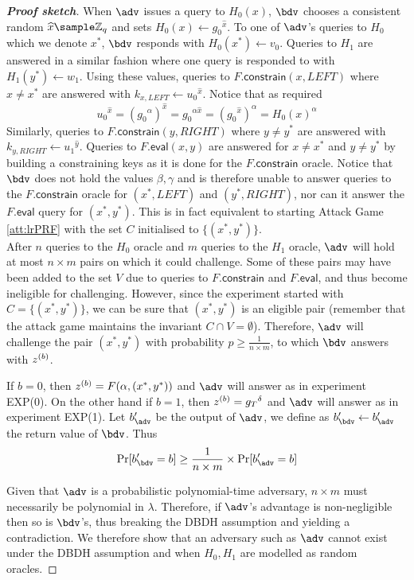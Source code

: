 \begin{proof}[\textbf{Proof sketch}]
			When $\adv$ issues a query to $H_0(x)$, $\bdv$ chooses a consistent random $\widehat x \sample \mathbb{Z}_q$ and sets $H_0(x) \leftarrow {g_0}^{\widehat x}$. To one of $\adv$'s queries to $H_0$ which we denote $x^*$, $\bdv$ responds with $H_0(x^*) \leftarrow v_0$. Queries to $H_1$ are answered in a similar fashion where one query is responded to with $H_1(y^*) \leftarrow w_1$. Using these values, queries to $F.\mathsf{constrain}(x,LEFT)$ where $x\neq x^*$ are answered with $k_{x,LEFT} \leftarrow  {u_0}^{\widehat x}$. Notice that as required
				$$ {u_0}^{\widehat x} = \left({g_0}^\alpha\right)^{\widehat x} = {g_0}^{\alpha \widehat x} = \left({g_0}^{\widehat x}\right)^{\alpha} = H_0(x)^\alpha$$
			Similarly, queries to $F.\mathsf{constrain}(y,RIGHT)$ where $y\neq y^*$ are answered with $k_{y,RIGHT} \leftarrow  {u_1}^{\widehat y}$. Queries to $F.\mathsf{eval}(x,y)$ are answered for $x \neq x^*$ and $y \neq y^*$ by building a constraining keys as it is done for the $F.\mathsf{constrain}$ oracle. Notice that $\bdv$ does not hold the values $\beta,\gamma$ and is therefore unable to answer queries to the $F.\mathsf{constrain}$ oracle for $(x^*, LEFT)$ and $(y^*, RIGHT)$, nor can it answer the $F.\mathsf{eval}$ query for $(x^*,y^*)$. This is in fact equivalent to starting Attack Game \autoref{att:lrPRF} with the set $C$ initialised to $\{(x^*,y^*)\}$. \\
			
			After $n$ queries to the $H_0$ oracle and $m$ queries to the $H_1$ oracle, $\adv$ will hold at most $n \times m$ pairs on which it could challenge.	 Some of these pairs may have been added to the set $V$ due to queries to $F.\mathsf{constrain}$ and $F.\mathsf{eval}$, and thus become ineligible for challenging. However, since the experiment started with $C = \{(x^*,y^*)\}$, we can be sure that $(x^*,y^*)$ is an eligible pair (remember that the attack game maintains the invariant $C \cap V = \emptyset$). Therefore, $\adv$ will challenge the pair $(x^*,y^*)$ with probability $p \geq \frac{1}{n\times m}$, to which $\bdv$ answers with $z^{(b)}$. 
			
			If $b=0$, then $z^{(b)} = F(\alpha, (x^*, y^*))$ and $\adv$ will answer as in experiment EXP(0). On the other hand if $b=1$, then $z^{(b)} = {g_T}^{\delta}$ and $\adv$ will answer as in experiment EXP(1). Let $b'_\adv$ be the output of $\adv$, we define as $b'_\bdv \leftarrow b'_\adv$ the return value of $\bdv$. Thus
			\begin{equation}
				\Pr[b'_\bdv = b] \geq \frac{1}{n \times m} \times \Pr[b'_\adv = b]
			\end{equation}
			
			Given that $\adv$ is a probabilistic polynomial-time adversary, $n \times m$ must necessarily be polynomial in $\lambda$. Therefore, if $\adv$'s advantage is non-negligible then so is $\bdv$'s, thus breaking the DBDH assumption and yielding a contradiction. We therefore show that an adversary such as $\adv$ cannot exist under the DBDH assumption and when $H_0,H_1$ are modelled as random oracles.
		\end{proof}
		
